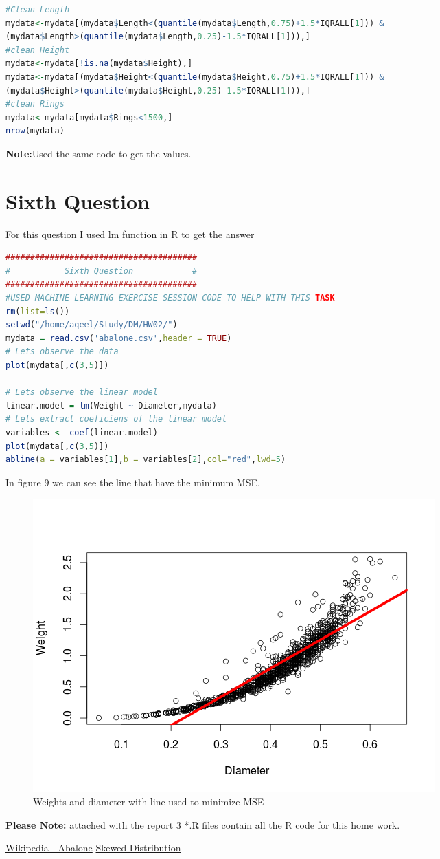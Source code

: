 \documentclass{article}
\begin{document}
\begin{multicols*}{2}
\begin{lstlisting}[language=R]
#Clean Length
mydata<-mydata[(mydata$Length<(quantile(mydata$Length,0.75)+1.5*IQRALL[1])) & 
(mydata$Length>(quantile(mydata$Length,0.25)-1.5*IQRALL[1])),]
#clean Height
mydata<-mydata[!is.na(mydata$Height),]
mydata<-mydata[(mydata$Height<(quantile(mydata$Height,0.75)+1.5*IQRALL[1])) & 
(mydata$Height>(quantile(mydata$Height,0.25)-1.5*IQRALL[1])),]
#clean Rings
mydata<-mydata[mydata$Rings<1500,]
nrow(mydata)
\end{lstlisting}
\textbf{Note:}Used the same code to get the values.
{\centering \section*{Sixth Question}}
For this question I used lm function in R to get the answer
\begin{lstlisting}[language=R]
#######################################
#           Sixth Question            #
#######################################
#USED MACHINE LEARNING EXERCISE SESSION CODE TO HELP WITH THIS TASK
rm(list=ls())
setwd("/home/aqeel/Study/DM/HW02/")
mydata = read.csv('abalone.csv',header = TRUE)
# Lets observe the data
plot(mydata[,c(3,5)])

# Lets observe the linear model
linear.model = lm(Weight ~ Diameter,mydata)
# Lets extract coeficiens of the linear model
variables <- coef(linear.model)
plot(mydata[,c(3,5)])
abline(a = variables[1],b = variables[2],col="red",lwd=5)
\end{lstlisting}
In figure 9 we can see the line that have the minimum MSE.
\begin{figure}[H]
\begin{center}
\includegraphics[scale=0.5]{plotprediction.png}
\end{center}
\caption{Weights and diameter with line used to minimize MSE}
\end{figure}
\textbf{Please Note:} attached with the report 3 *.R files contain all the R code for this home work.\\

\begin{thebibliography}{9}
	\href{https://en.wikipedia.org/wiki/Abalone}{Wikipedia - Abalone}
	\href{http://study.com/academy/lesson/skewed-distribution-examples-definition-quiz.html}{Skewed Distribution}
\end{thebibliography}
\end{multicols*}
\end{document}
